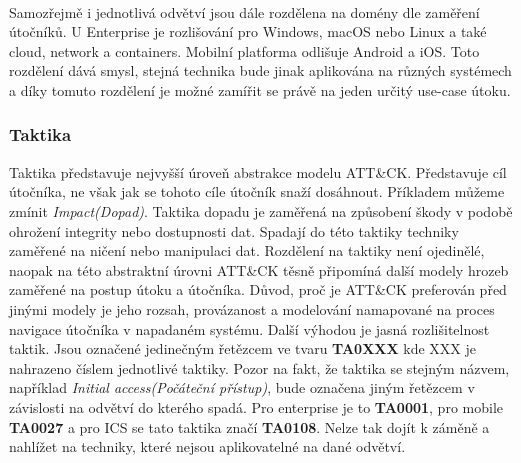 \paragraph{}
Samozřejmě i jednotlivá odvětví jsou dále rozdělena na domény dle zaměření útočníků.
U Enterprise je rozlišování pro Windows, macOS nebo Linux a také cloud, network a containers.
Mobilní platforma odlišuje Android a iOS\@.
Toto rozdělení dává smysl, stejná technika bude jinak aplikována na různých systémech a díky tomuto rozdělení je možné zamířit se právě na jeden určitý use-case útoku.

\subsubsection{Taktika}
Taktika představuje nejvyšší úroveň abstrakce modelu ATT\&CK\@.
Představuje cíl útočníka, ne však jak se tohoto cíle útočník snaží dosáhnout.
Příkladem můžeme zmínit \textit{Impact(Dopad)}.
Taktika dopadu je zaměřená na způsobení škody v podobě ohrožení integrity nebo dostupnosti dat.
Spadají do této taktiky techniky zaměřené na ničení nebo manipulaci dat.
Rozdělení na taktiky není ojedinělé, naopak na této abstraktní úrovni ATT\&CK těsně připomíná další modely hrozeb zaměřené na postup útoku a útočníka.
Důvod, proč je ATT\&CK preferován před jinými modely je jeho rozsah, provázanost a modelování namapované na proces navigace útočníka v napadaném systému.
Další výhodou je jasná rozlišitelnost taktik.
Jsou označené jedinečným řetězcem ve tvaru \textbf{TA0XXX} kde XXX je nahrazeno číslem jednotlivé taktiky.
Pozor na fakt, že taktika se stejným názvem, například \textit{Initial access(Počáteční přístup)}, bude označena jiným řetězcem v závislosti na odvětví do kterého spadá.
Pro enterprise je to \textbf{TA0001}, pro mobile \textbf{TA0027} a pro ICS se tato taktika značí \textbf{TA0108}.
Nelze tak dojít k záměně a nahlížet na techniky, které nejsou aplikovatelné na dané odvětví.\cite{Mitre_finding_cyber_threats, mitre_attack_framework}

